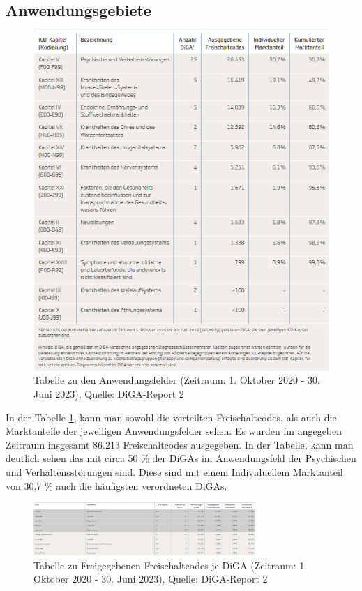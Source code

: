 \documentclass{article}
\begin{document}
		\subsection{Anwendungsgebiete}
			\begin{figure}[htbp]
				\centering
				\includegraphics[height=0.5\textheight]{./grafiken/tabelle_anwendungsfelder_diga}
				\caption[Anwendungsfelder der DiGA]{Tabelle zu den Anwendungsfelder (Zeitraum: 1. Oktober 2020 - 30. Juni 2023), Quelle: DiGA-Report 2 \cite{TK-Report-2}}
				\label{Tab-anwendungsfelder-diga}
			\end{figure}
			In der Tabelle \ref{Tab-anwendungsfelder-diga}, kann man sowohl die verteilten Freischaltcodes, als auch die Marktanteile der jeweiligen Anwendungsfelder sehen. Es wurden im angegeben Zeitraum insgesamt 86.213 Freischaltcodes ausgegeben. In der Tabelle, kann man deutlich sehen das mit circa 50 \% der DiGAs im Anwendungsfeld der Psychischen und Verhaltensstörungen sind. Diese sind mit einem Individuellem Marktanteil von 30,7 \% auch die häufigsten verordneten DiGAs.
			\newpage
			\begin{figure}[htbp]
				\centering
				\includegraphics[width=0.75\textwidth]{./grafiken/tab_diga_verteilung}
				\caption[Freigegebene Freischaltcode je DiGA]{Tabelle zu Freigegebenen Freischaltcodes je DiGA (Zeitraum: 1. Oktober 2020 - 30. Juni 2023), Quelle: DiGA-Report 2 \cite{TK-Report-2}}
				\label{Tab-freischaltcodes-je-diga}
			\end{figure}
\end{document}
